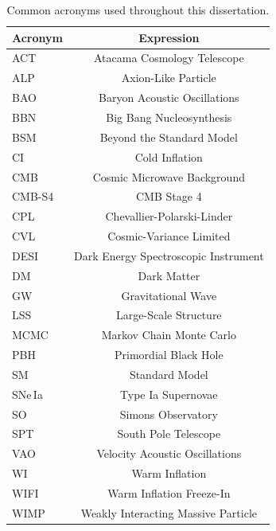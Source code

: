\begin{table}[ht!]
	\centering
	\begin{tabular}{l c}
			\toprule
		Acronym 					& Expression															\\
			\midrule[0.065em]
		ACT 					& Atacama Cosmology Telescope										\\
		ALP 					& Axion-Like Particle												\\
		BAO 					& Baryon Acoustic Oscillations										\\
		BBN 					& Big Bang Nucleosynthesis											\\
		BSM 					& Beyond the Standard Model											\\
		CI 						& Cold Inflation														\\
		CMB 					& Cosmic Microwave Background											\\
		CMB-S4 					& CMB Stage 4														\\
		CPL 					& Chevallier-Polarski-Linder										\\
		CVL 					& Cosmic-Variance Limited											\\
		DESI 					& Dark Energy Spectroscopic Instrument								\\
		DM 						& Dark Matter														\\
		GW 						& Gravitational Wave				\\
		LSS 					& Large-Scale Structure												\\
		MCMC 					& Markov Chain Monte Carlo											\\
		PBH 					& Primordial Black Hole										\\

		SM 						& Standard Model														\\
		SNe\,Ia					& Type Ia Supernovae												\\
		SO 						& Simons Observatory												\\
		SPT 					& South Pole Telescope									\\
		VAO 					& Velocity Acoustic Oscillations									\\
		WI 						& Warm Inflation														\\
		WIFI 					& Warm Inflation Freeze-In											\\
		WIMP 					& Weakly Interacting Massive Particle \\\bottomrule
	\end{tabular}
	\caption[Common acronyms used throughout this dissertation.]{Common acronyms used throughout this dissertation.}
\label{tab:abbreviations}
\end{table}